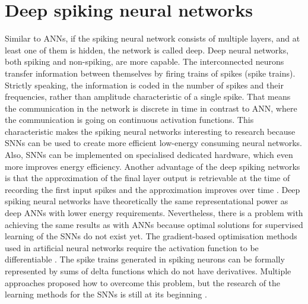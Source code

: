\section{Deep spiking neural networks}
Similar to ANNs, if the spiking neural network consists of multiple layers, and at least one of them is hidden, the network is called deep. Deep neural networks, both spiking and non-spiking, are more capable. The interconnected neurons transfer information between themselves by firing trains of spikes (spike trains). Strictly speaking, the information is coded in the number of spikes and their frequencies, rather than amplitude characteristic of a single spike. That means the communication in the network is discrete in time in contrast to ANN, where the communication is going on continuous activation functions. This characteristic makes the spiking neural networks interesting to research because SNNs can be used to create more efficient low-energy consuming neural networks. Also, SNNs can be implemented on specialised dedicated hardware, which even more improves energy efficiency. Another advantage of the deep spiking networks is that the approximation of the final layer output is retrievable at the time of recording the first input spikes and the approximation improves over time \cite{pfeifferDeepLearningSpiking2018}.
Deep spiking neural networks have theoretically the same representational power as deep ANNs with lower energy requirements. Nevertheless, there is a problem with achieving the same results as with ANNs because optimal solutions for supervised learning of the SNNs do not exist yet. The gradient-based optimisation methods used in artificial neural networks require the activation function to be differentiable \cite{tavanaeiDeepLearningSpiking2019}. The spike trains generated in spiking neurons can be formally represented by sums of delta functions which do not have derivatives. Multiple approaches proposed how to overcome this problem, but the research of the learning methods for the SNNs is still at its beginning \cite{tavanaeiDeepLearningSpiking2019}. 

